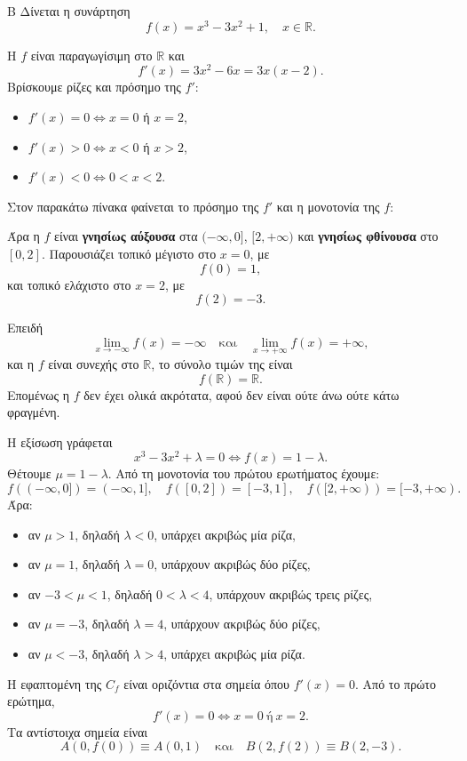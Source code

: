\begin{thema}{Β}
Δίνεται η συνάρτηση
\[
f(x)=x^3-3x^2+1,\quad x\in\mathbb{R}.
\]

\begin{erwthma}
\item Η $f$ είναι παραγωγίσιμη στο $\mathbb{R}$ και
\[
f'(x)=3x^2-6x=3x(x-2).
\]
Βρίσκουμε ρίζες και πρόσημο της $f'$:
\begin{itemize}
\item $f'(x)=0\Leftrightarrow x=0$ ή $x=2$,
\item $f'(x)>0\Leftrightarrow x<0$ ή $x>2$,
\item $f'(x)<0\Leftrightarrow 0<x<2$.
\end{itemize}
Στον παρακάτω πίνακα φαίνεται το πρόσημο της $f'$ και η μονοτονία της $f$:
\begin{center}
\end{center}
Άρα η $f$ είναι \textbf{γνησίως αύξουσα} στα $(-\infty,0]$, $[2,+\infty)$ και \textbf{γνησίως φθίνουσα} στο $[0,2]$. Παρουσιάζει τοπικό μέγιστο στο $x=0$, με
\[
f(0)=1,
\]
και τοπικό ελάχιστο στο $x=2$, με
\[
f(2)=-3.
\]

\item Επειδή
\[
\lim_{x\to-\infty}f(x)=-\infty
\quad\text{και}\quad
\lim_{x\to+\infty}f(x)=+\infty,
\]
και η $f$ είναι συνεχής στο $\mathbb{R}$, το σύνολο τιμών της είναι
\[
f(\mathbb{R})=\mathbb{R}.
\]
Επομένως η $f$ δεν έχει ολικά ακρότατα, αφού δεν είναι ούτε άνω ούτε κάτω φραγμένη.

\item Η εξίσωση γράφεται
\[
x^3-3x^2+\lambda=0
\Leftrightarrow f(x)=1-\lambda.
\]
Θέτουμε $\mu=1-\lambda$. Από τη μονοτονία του πρώτου ερωτήματος έχουμε:
\[
f((-\infty,0])=(-\infty,1],\quad
f([0,2])=[-3,1],\quad
f([2,+\infty))=[-3,+\infty).
\]
Άρα:
\begin{itemize}
\item αν $\mu>1$, δηλαδή $\lambda<0$, υπάρχει ακριβώς μία ρίζα,
\item αν $\mu=1$, δηλαδή $\lambda=0$, υπάρχουν ακριβώς δύο ρίζες,
\item αν $-3<\mu<1$, δηλαδή $0<\lambda<4$, υπάρχουν ακριβώς τρεις ρίζες,
\item αν $\mu=-3$, δηλαδή $\lambda=4$, υπάρχουν ακριβώς δύο ρίζες,
\item αν $\mu<-3$, δηλαδή $\lambda>4$, υπάρχει ακριβώς μία ρίζα.
\end{itemize}

\item Η εφαπτομένη της $C_f$ είναι οριζόντια στα σημεία όπου $f'(x)=0$. Από το πρώτο ερώτημα,
\[
f'(x)=0\Leftrightarrow x=0\ \text{ή}\ x=2.
\]
Τα αντίστοιχα σημεία είναι
\[
A(0,f(0))\equiv A(0,1)
\quad\text{και}\quad
B(2,f(2))\equiv B(2,-3).
\]
\end{erwthma}
\end{thema}
